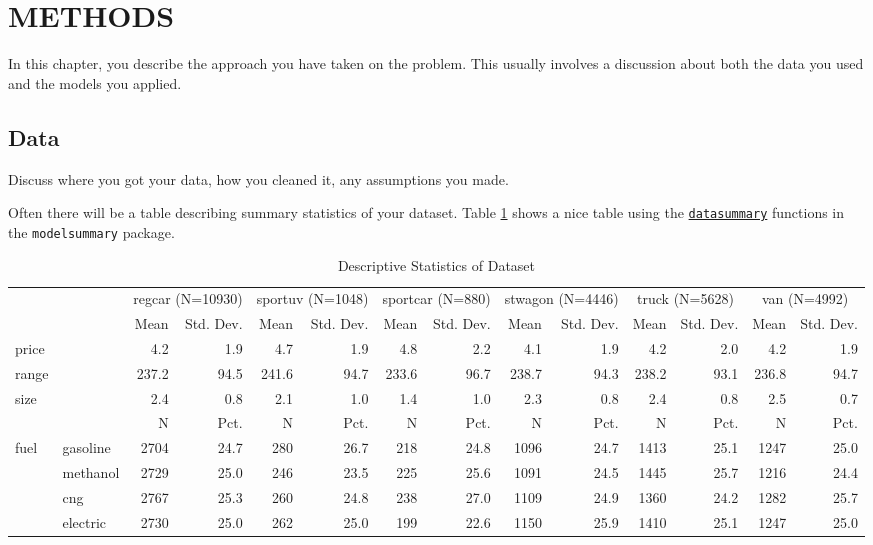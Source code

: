\documentclass[3p, authoryear]{elsarticle} %
\begin{document}
\hypertarget{methods}{%
\section{METHODS}\label{methods}}

In this chapter, you describe the approach you have taken on the problem. This
usually involves a discussion about both the data you used and the models you
applied.

\hypertarget{data}{%
\subsection{Data}\label{data}}

Discuss where you got your data, how you cleaned it, any assumptions you made.

Often there will be a table describing summary statistics of your dataset.
Table \ref{tab:datasummary} shows a nice table using the \href{https://vincentarelbundock.github.io/modelsummary/articles/datasummary.html}{\texttt{datasummary}}
functions in the \texttt{modelsummary} package.

\begin{table}

\caption{\label{tab:datasummary}Descriptive Statistics of Dataset}
\centering
\begin{tabular}[t]{llrrrrrrrrrrrr}
\toprule
\multicolumn{2}{c}{ } & \multicolumn{2}{c}{regcar (N=10930)} & \multicolumn{2}{c}{sportuv (N=1048)} & \multicolumn{2}{c}{sportcar (N=880)} & \multicolumn{2}{c}{stwagon (N=4446)} & \multicolumn{2}{c}{truck (N=5628)} & \multicolumn{2}{c}{van (N=4992)} \\
\cmidrule(l{3pt}r{3pt}){3-4} \cmidrule(l{3pt}r{3pt}){5-6} \cmidrule(l{3pt}r{3pt}){7-8} \cmidrule(l{3pt}r{3pt}){9-10} \cmidrule(l{3pt}r{3pt}){11-12} \cmidrule(l{3pt}r{3pt}){13-14}
  &    & Mean & Std. Dev. & Mean  & Std. Dev.  & Mean   & Std. Dev.   & Mean    & Std. Dev.    & Mean     & Std. Dev.     & Mean      & Std. Dev.     \\
\midrule
price &  & 4.2 & 1.9 & 4.7 & 1.9 & 4.8 & 2.2 & 4.1 & 1.9 & 4.2 & 2.0 & 4.2 & 1.9\\
range &  & 237.2 & 94.5 & 241.6 & 94.7 & 233.6 & 96.7 & 238.7 & 94.3 & 238.2 & 93.1 & 236.8 & 94.7\\
size &  & 2.4 & 0.8 & 2.1 & 1.0 & 1.4 & 1.0 & 2.3 & 0.8 & 2.4 & 0.8 & 2.5 & 0.7\\
\midrule
 &  & N & Pct. & N & Pct. & N & Pct. & N & Pct. & N & Pct. & N & Pct.\\
fuel & gasoline & 2704 & 24.7 & 280 & 26.7 & 218 & 24.8 & 1096 & 24.7 & 1413 & 25.1 & 1247 & 25.0\\
 & methanol & 2729 & 25.0 & 246 & 23.5 & 225 & 25.6 & 1091 & 24.5 & 1445 & 25.7 & 1216 & 24.4\\
 & cng & 2767 & 25.3 & 260 & 24.8 & 238 & 27.0 & 1109 & 24.9 & 1360 & 24.2 & 1282 & 25.7\\
 & electric & 2730 & 25.0 & 262 & 25.0 & 199 & 22.6 & 1150 & 25.9 & 1410 & 25.1 & 1247 & 25.0\\
\bottomrule
\end{tabular}
\end{table}
\end{document}
